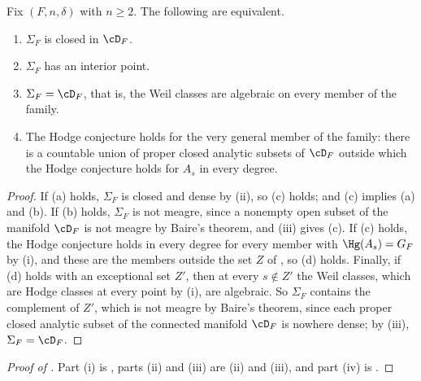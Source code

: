 \begin{corollary}
\label{cor:verygeneral}
Fix $(F,n,\delta)$ with $n\ge2$. The following are equivalent.
\begin{enumerate}[label=\textup{(\alph*)},leftmargin=2.6em,itemsep=2pt]
\item $\Sigma_{F}$ is closed in $\cD_{F}$.
\item $\Sigma_{F}$ has an interior point.
\item $\Sigma_{F}=\cD_{F}$, that is, the Weil classes are algebraic on every
  member of the family.
\item The Hodge conjecture holds for the very general member of the family:
  there is a countable union of proper closed analytic subsets of $\cD_{F}$
  outside which the Hodge conjecture holds for $A_{s}$ in every degree.
\end{enumerate}
\end{corollary}

\begin{proof}
If (a) holds, $\Sigma_{F}$ is closed and dense by
(ii), so (c) holds; and (c) implies (a) and (b). If
(b) holds, $\Sigma_{F}$ is not meagre, since a nonempty open subset of the
manifold $\cD_{F}$ is not meagre by Baire's theorem, and
(iii) gives (c). If (c) holds, the Hodge conjecture
holds in every degree for every member with $\Hg(A_{s})=G_{F}$ by
(i), and these are the members outside the set $Z$ of
, so (d) holds. Finally, if (d) holds with an exceptional
set $Z'$, then at every $s\notin Z'$ the Weil classes, which are Hodge classes
at every point by (i), are algebraic. So $\Sigma_{F}$
contains the complement of $Z'$, which is not meagre by Baire's theorem,
since each proper closed analytic subset of the connected manifold $\cD_{F}$
is nowhere dense; by (iii), $\Sigma_{F}=\cD_{F}$.
\end{proof}

\begin{proof}[Proof of ]
Part (i) is , parts (ii) and (iii) are
(ii) and (iii), and part (iv) is
.
\end{proof}

